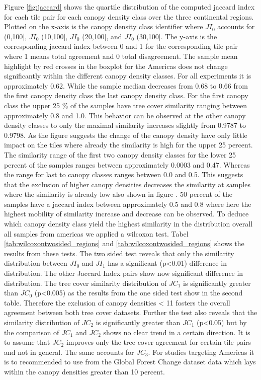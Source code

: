 			 Figure \ref{fig:jaccard} shows the quartile distribution of the computed jaccard index for each tile pair for each canopy density class over the three continental regions. Plotted on the x-axis is the canopy density class identifier where $JI_0$ accounts for (0,100], $JI_0$ (10,100], $JI_0$ (20,100], and $JI_0$ (30,100]. The y-axis is the corresponding jaccard index between 0 and 1 for the corresponding tile pair where 1 means total agreement and 0 total disagreement. The sample mean highlight by red crosses in the boxplot for the Americas does not change significantly within the different canopy density classes. For all experiments it is approximately 0.62. While the sample median decreases from 0.68 to 0.66 from the first canopy density class the last canopy density class. For the first canopy class the upper 25 \% of the samples have tree cover similarity ranging between approximately 0.8 and 1.0. This behavior can be observed at the other canopy density classes to only the maximal similarity increases slightly from 0.9787 to 0.9798. As the figure  suggests the change of the canopy density have only little impact on the tiles where already the similarity is high for the upper 25 percent. The similarity range of the first two canopy density classes for the lower 25 percent of the samples ranges between approximately 0.0003 and 0.47. Whereas the range for last to canopy classes ranges between 0.0 and 0.5. This suggests that the exclusion of higher canopy densities decreases the similarity at samples where the similarity is already low also shown in figure . 50 percent of the samples have a jaccard index between approximately 0.5 and 0.8 where here the highest mobility of similarity increase and decrease can be observed. To deduce which canopy density class yield the highest similarity in the distribution overall all samples from americas we applied a wilcoxon test. Tabel \ref{tab:wilcoxontwosided_regions} and \ref{tab:wilcoxontwosided_regions} shows the results from these tests. The two sided test reveals that only the similarity distribution between $JI_0$ and $JI_1$ has a significant (p<0.01) difference in distribution. The other Jaccard Index pairs show now significant difference in distribution. The tree cover similarity distribution of $JC_1$ is significantly greater than $JC_0$ (p<0.005) as the results from the one sided test show in the second table. Therefore the exclusion of canopy densities < 11 fosters the overall agreement between both tree cover datasets. Further the test also reveals that the similarity distribution of $JC_2$ is significantly greater than $JC_1$ (p<0.05) but by the comparison of $JC_1$ and $JC_2$ shows no clear trend in a certain direction. It is to assume that $JC_2$ improves only the tree cover agreement for certain tile pairs and not in general. The same accounts for $JC_3$. For studies targeting Americas it is to recommended to use from the Global Forest Change dataset data which lays within the canopy densities greater than 10 percent.
